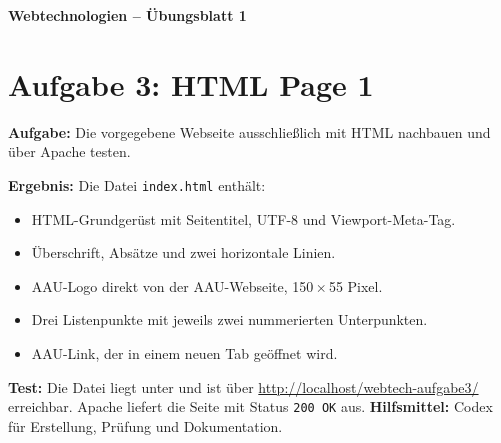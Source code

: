 \documentclass[11pt,a4paper]{article}
\begin{document}
\begin{center}
  {\Large\textbf{Webtechnologien -- Übungsblatt 1}}
\end{center}
\section*{Aufgabe 3: HTML Page 1}
\textbf{Aufgabe:} Die vorgegebene Webseite ausschließlich mit HTML
nachbauen und über Apache testen.

\medskip
\textbf{Ergebnis:} Die Datei \texttt{index.html} enthält:
\begin{itemize}
  \item HTML-Grundgerüst mit Seitentitel, UTF-8 und Viewport-Meta-Tag.
  \item Überschrift, Absätze und zwei horizontale Linien.
  \item AAU-Logo direkt von der AAU-Webseite, 150\,$\times$\,55 Pixel.
  \item Drei Listenpunkte mit jeweils zwei nummerierten Unterpunkten.
  \item AAU-Link, der in einem neuen Tab geöffnet wird.
\end{itemize}
\textbf{Test:} Die Datei liegt unter
 und ist über
\url{http://localhost/webtech-aufgabe3/} erreichbar.
Apache liefert die Seite mit Status \texttt{200 OK} aus.
\medskip
{\small \textbf{Hilfsmittel:} Codex für Erstellung, Prüfung und Dokumentation.}
\end{document}
